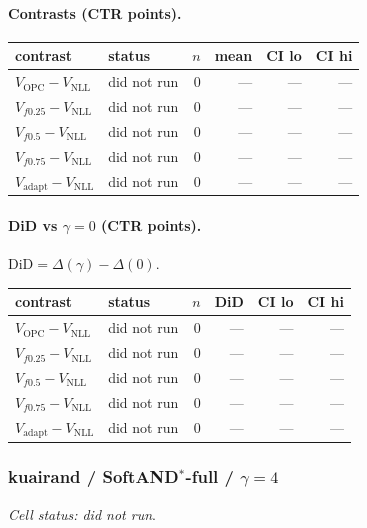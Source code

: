 \documentclass[10pt,a4paper]{article}
\begin{document}
\paragraph{Contrasts (CTR points).}
{\centering\small\begin{tabular}{llrrrr}
\toprule contrast & status & $n$ & mean & CI lo & CI hi \\
\midrule
$V_{\mathrm{OPC}}-V_{\mathrm{NLL}}$ & did not run & 0 & --- & --- & --- \\
$V_{f0.25}-V_{\mathrm{NLL}}$ & did not run & 0 & --- & --- & --- \\
$V_{f0.5}-V_{\mathrm{NLL}}$ & did not run & 0 & --- & --- & --- \\
$V_{f0.75}-V_{\mathrm{NLL}}$ & did not run & 0 & --- & --- & --- \\
$V_{\mathrm{adapt}}-V_{\mathrm{NLL}}$ & did not run & 0 & --- & --- & --- \\
\bottomrule\end{tabular}\par}
\paragraph{DiD vs $\gamma=0$ (CTR points).} $\mathrm{DiD}=\Delta(\gamma)-\Delta(0)$.
{\centering\small\begin{tabular}{llrrrr}
\toprule contrast & status & $n$ & DiD & CI lo & CI hi \\
\midrule
$V_{\mathrm{OPC}}-V_{\mathrm{NLL}}$ & did not run & 0 & --- & --- & --- \\
$V_{f0.25}-V_{\mathrm{NLL}}$ & did not run & 0 & --- & --- & --- \\
$V_{f0.5}-V_{\mathrm{NLL}}$ & did not run & 0 & --- & --- & --- \\
$V_{f0.75}-V_{\mathrm{NLL}}$ & did not run & 0 & --- & --- & --- \\
$V_{\mathrm{adapt}}-V_{\mathrm{NLL}}$ & did not run & 0 & --- & --- & --- \\
\bottomrule\end{tabular}\par}
\bigskip
\subsubsection{kuairand / SoftAND$^*$-full / $\gamma=4$}
\emph{Cell status: did not run}.
\end{document}
